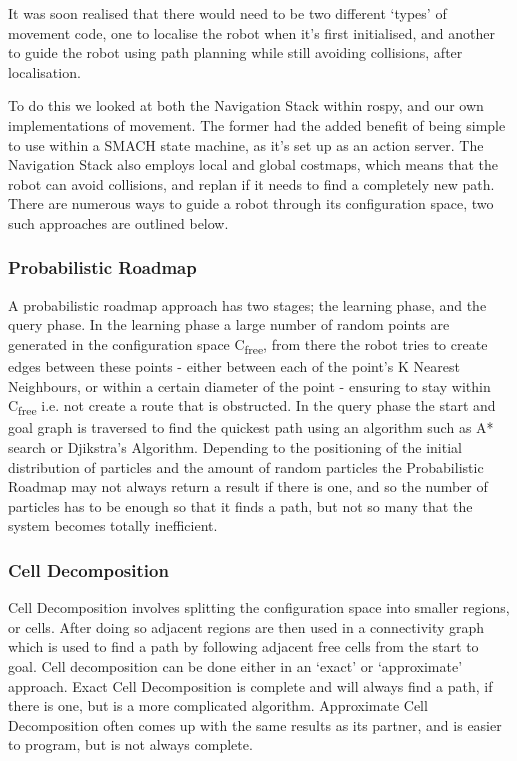 It was soon realised that there would need to be two different `types' of movement code, one to localise the robot when it's first initialised, and another to guide the robot using path planning while still avoiding collisions, after localisation.

To do this we looked at both the Navigation Stack within rospy, and our own implementations of movement. The former had the added benefit of being simple to use within a SMACH state machine, as it's set up as an action server. The Navigation Stack also employs local and global costmaps, which means that the robot can avoid collisions, and replan if it needs to find a completely new path. There are numerous ways to guide a robot through its configuration space, two such approaches are outlined below.

\subsubsection{Probabilistic Roadmap}

A probabilistic roadmap approach has two stages; the learning phase, and the query phase. In the learning phase a large number of random points are generated in the configuration space C\textsubscript{free}, from there the robot tries to create edges between these points - either between each of the point's K Nearest Neighbours, or within a certain diameter of the point - ensuring to stay within C\textsubscript{free} i.e. not create a route that is obstructed. In the query phase the start and goal graph is traversed to find the quickest path using an algorithm such as A* search or Djikstra's Algorithm. Depending to the positioning of the initial distribution of particles and the amount of random particles the Probabilistic Roadmap may not always return a result if there is one, and so the number of particles has to be enough so that it finds a path, but not so many that the system becomes totally inefficient.

\subsubsection{Cell Decomposition}

Cell Decomposition involves splitting the configuration space into smaller regions, or cells. \parencite{kl}
After doing so adjacent regions are then used in a connectivity graph which is used to find a path by following adjacent free cells from the start to goal. Cell decomposition can be done either in an ‘exact’ or ‘approximate’ approach. Exact Cell Decomposition is complete and will always find a path, if there is one, but is a more complicated algorithm. Approximate Cell Decomposition often comes up with the same results as its partner, and is easier to program, but is not always complete. \parencite{stan}

